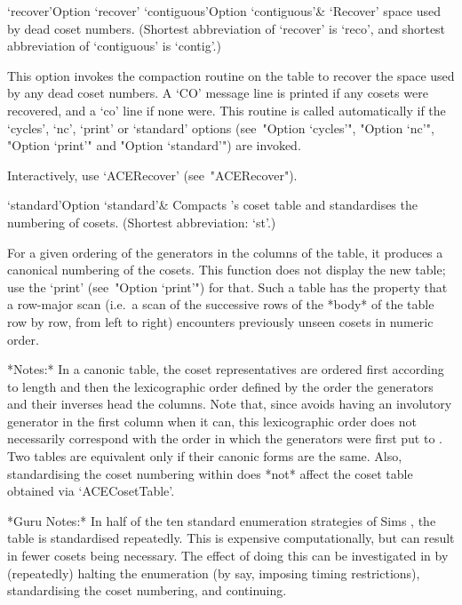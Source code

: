 \>`recover'{Option `recover'}
\>`contiguous'{Option `contiguous'}&
`Recover' space used by dead coset numbers.
(Shortest  abbreviation  of  `recover'   is   `reco',   and   shortest
abbreviation of `contiguous' is `contig'.)

This option invokes the compaction routine on the table to recover the
space used by any dead coset numbers. A `CO' message line  is  printed
if any cosets were recovered, and a  `co'  line  if  none  were.  This
routine is called automatically if  the  `cycles',  `nc',  `print'  or
`standard' options  (see~"Option  `cycles'",  "Option  `nc'",  "Option
`print'" and "Option `standard'") are invoked.

Interactively, use `ACERecover' (see~"ACERecover").

\>`standard'{Option `standard'}&
Compacts {\ACE}'s  coset  table  and  standardises  the  numbering  of
cosets. (Shortest abbreviation: `st'.)

For a given ordering of the generators in the columns of the table, it
produces a canonical numbering of the cosets. This function  does  not
display the new table; use  the  `print'  (see~"Option  `print'")  for
that. Such a table has the property that a row-major scan (i.e.~a scan
of the successive rows of the *body* of the table  row  by  row,  from
left to right) encounters previously unseen cosets in numeric order.

*Notes:*
In a canonic  table,  the  coset  representatives  are  ordered  first
according to length and then the lexicographic order  defined  by  the
order the generators and their inverses head the columns.  Note  that,
since {\ACE} avoids having an involutory generator in the first column
when it can, this lexicographic order does not necessarily  correspond
with the order in which the generators were first put to  {\ACE}.  Two
tables are equivalent only if their canonic forms are the same.  Also,
standardising the coset numbering within {\ACE} does *not* affect  the
{\GAP} coset table obtained via `ACECosetTable'.

*Guru Notes:*
In  half  of  the  ten  standard  enumeration   strategies   of   Sims
\cite{Sim94}, the table is standardised repeatedly. This is  expensive
computationally, but can result in fewer cosets being  necessary.  The
effect of doing this can be investigated  in  {\ACE}  by  (repeatedly)
halting  the  enumeration  (by  say,  imposing  timing  restrictions),
standardising the coset numbering, and continuing.

